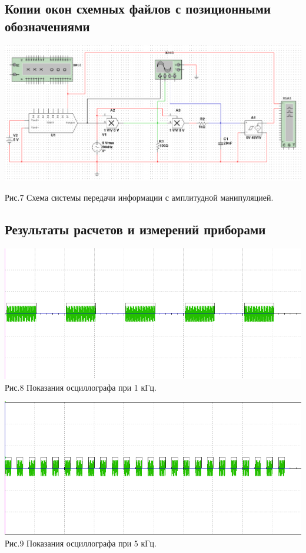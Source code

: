 \documentclass[11pt]{article}
\begin{document}
\subsection{Копии окон схемных файлов с позиционными обозначениями}
\includegraphics[width=1\linewidth]{img/third.png}
\begin{center}
    Рис.7 Схема системы передачи информации с амплитудной манипуляцией.
\end{center}

\subsection{Результаты расчетов и измерений приборами}
\begin{center}
    \includegraphics[width=1\linewidth]{img/third1.png}
        Рис.8 Показания осциллографа при 1 кГц.
\end{center}

\begin{center}
    \includegraphics[width=1\linewidth]{img/third2.png}
        Рис.9 Показания осциллографа при 5 кГц.
\end{center}
\end{document}
